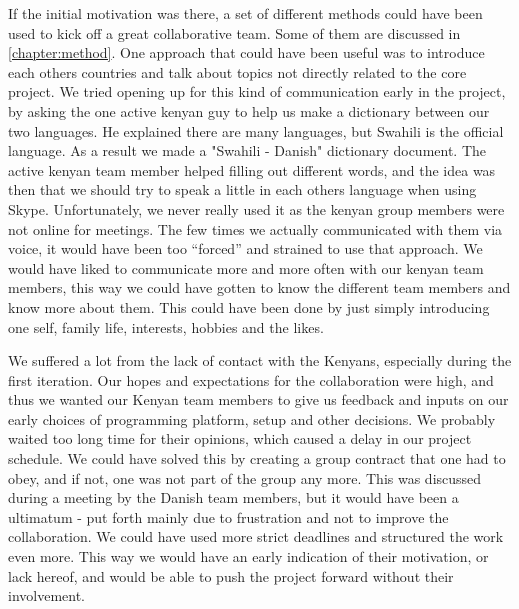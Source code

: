 If the initial motivation was there, a set of different methods could have been used to kick off a great collaborative team. Some of them are discussed in \ref{chapter:method}. One approach that could have been useful was to introduce each others countries and talk about topics not directly related to the core project. We tried opening up for this kind of communication early in the project, by asking the one active kenyan guy to help us make a dictionary between our two languages. He explained there are many languages, but Swahili is the official language. As a result we made a "Swahili - Danish" dictionary document. The active kenyan team member helped filling out different words, and the idea was then that we should try to speak a little in each others language when using Skype. Unfortunately, we never really used it as the kenyan group members were not online for meetings. The few times we actually communicated with them via voice, it would have been too ``forced'' and strained to use that approach. We would have liked to communicate more and more often with our kenyan team members, this way we could have gotten to know the different team members and know more about them. This could have been done by just simply introducing one self, family life, interests, hobbies and the likes.

We suffered a lot from the lack of contact with the Kenyans, especially during the first iteration. Our hopes and expectations for the collaboration were high, and thus we wanted our Kenyan team members to give us feedback and inputs on our early choices of programming platform, setup and other decisions. We probably waited too long time for their opinions, which caused a delay in our project schedule. We could have solved this by creating a group contract that one had to obey, and if not, one was not part of the group any more. This was discussed during a meeting by the Danish team members, but it would have been a ultimatum - put forth mainly due to frustration and not to improve the collaboration. We could have used more strict deadlines and structured the work even more. This way we would have an early indication of their motivation, or lack hereof, and would be able to push the project forward without their involvement. 

